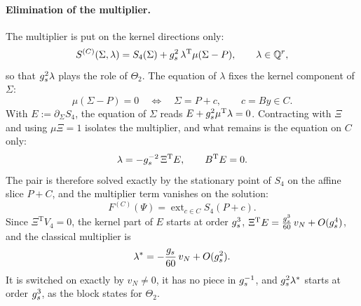 \paragraph{Elimination of the multiplier.}
The multiplier is put on the kernel directions only:
\begin{equation}
  \label{eq:mult:hyb:multiplier}
  S^{(C)}(\Sigma, \lambda)
    = S_4(\Sigma)
      + g_s^2 \, \lambda^{\mathrm{T}} \mu (\Sigma - P),
  \qquad
  \lambda \in \mathbb{Q}^r,
\end{equation}
so that $g_s^2 \lambda$ plays the role of $\Theta_2$.
The equation of $\lambda$ fixes the kernel component of $\Sigma$:
\begin{equation}
  \mu (\Sigma - P)
    = 0
  \quad \Longleftrightarrow \quad
  \Sigma
    = P + c,
  \qquad
  c
    = B y
    \in C.
\end{equation}
With $E := \partial_\Sigma S_4$, the equation of $\Sigma$ reads $E + g_s^2 \mu^{\mathrm{T}} \lambda = 0$.
Contracting with $\Xi$ and using $\mu \Xi = 1$ isolates the multiplier, and what remains is the equation on $C$ only:
\begin{equation}
  \lambda
    = - g_s^{-2} \, \Xi^{\mathrm{T}} E,
  \qquad
  B^{\mathrm{T}} E
    = 0.
\end{equation}
The pair is therefore solved exactly by the stationary point of $S_4$ on the affine slice $P + C$, and the multiplier term vanishes on the solution:
\begin{equation}
  F^{(C)}(\Psi)
    = \operatorname{ext}_{c \in C} S_4(P + c).
\end{equation}
Since $\Xi^{\mathrm{T}} V_4 = 0$, the kernel part of $E$ starts at order $g_s^3$, $\Xi^{\mathrm{T}} E = \frac{g_s^3}{60} \, v_N + O(g_s^4)$, and the classical multiplier is
\begin{equation}
  \lambda^*
    = - \frac{g_s}{60} \, v_N + O(g_s^2).
\end{equation}
It is switched on exactly by $v_N \neq 0$, it has no piece in $g_s^{-1}$, and $g_s^2 \lambda^*$ starts at order $g_s^3$, as the block states for $\Theta_2$.

